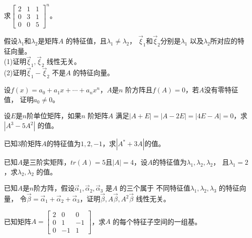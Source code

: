 \begin{ex}\label{7.5}
求$\begin{bmatrix}2&1&1\\0&3&1\\0&0&5\end{bmatrix}^{n}$。
\end{ex}

\begin{ex}\label{7.6}
假设$\lambda_1$和$\lambda_2$是矩阵$A$ 的特征值，且$\lambda_1\neq\lambda_2$，
$\vec{\xi}_1$和$\vec{\xi}_2$分别是$\lambda_1$ 以及$\lambda_2$所对应的特征向量。\\
(1)证明$\vec{\xi}_1,\vec{\xi}_2$ 线性无关。\\
(2)证明$\vec{\xi}_1-\vec{\xi}_2$ 不是$A$ 的特征向量。
\end{ex}

\begin{ex}\label{7.7}
设$f(x)=a_0+a_1x+\cdots+a_nx^n$，$A$是$n$ 阶方阵且$f(A)=0$，若$A$没有零特征值，
证明$a_0\neq0$。
\end{ex}

\begin{ex}\label{7.8}
设$E$是$n$阶单位矩阵，如果$n$ 阶矩阵$A$ 满足$|A+E|=|A-2E|=|4E-A|=0$，求$|A^3-5A^2|$ 的值。
\end{ex}

\begin{ex}\label{7.9}
已知3阶矩阵$A$的特征值为$1,2,-1$，求$|A^*+3A|$的值。
\end{ex}

\begin{ex}\label{7.10}
已知$A$是三阶实矩阵，$tr(A)=5$且$|A|=4$，设$A$的特征值为$\lambda_1,\lambda_2,\lambda_2$，
且$\lambda_1=2$，求$\lambda_2,\lambda_2$ 的值。
\end{ex}

\begin{ex}\label{7.11}
已知$A$是$n$阶方阵，假设$\vec{\alpha}_1,\vec{\alpha}_2,\vec{\alpha}_3$ 是$A$ 的三个属于
不同特征值$\lambda_1,\lambda_2,\lambda_3$ 的特征向量，
令$\vec{\beta}=\vec{\alpha}_1+\vec{\alpha}_2+\vec{\alpha}_3$，证明$\vec{\beta},A\vec{\beta},A^2\vec{\beta}$ 线性无关。
\end{ex}

\begin{ex}\label{7.12}
已知矩阵$A=\begin{bmatrix}2&0&0\\0&1&-1\\0&-1&1\end{bmatrix}$，求$A$ 的每个特征子空间的一组基。
\end{ex}

